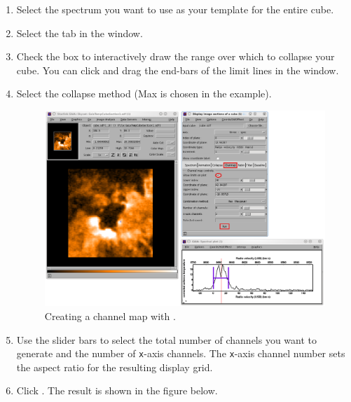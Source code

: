 \documentclass[11pt,oneside,chapters]{starlink}
\begin{document}
\begin{enumerate}[label=(\textbf{\arabic*})]
\item  Select the spectrum you want to use as your template for the entire cube.

\item Select the  tab in the  window.

\item Check the  box to interactively
draw the range over which to collapse your cube. You can click and
drag the end-bars of the limit lines in the 
window.

\item Select the collapse method (Max is chosen in the example).

\begin{figure}[h!]
\begin{center}
\includegraphics[width=0.93\linewidth]{sc20_gaia_channel1}
\caption[Creating a channel map with \gaia.]{\label{fig:gaia_chan1}
  Creating a channel map with \gaia.}
\end{center}
\end{figure}

\item Use the slider bars to select the total number of channels you
want to generate and the number of \texttt{x}-axis channels. The
\texttt{x}-axis channel number sets the aspect ratio for the resulting
display grid.

\item Click . The result is shown in the figure below.


\end{enumerate}
\end{document}
